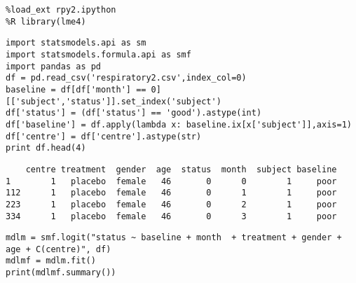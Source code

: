 \documentclass[12pt,fleqn]{article}\usepackage{../common}
\begin{document}
\begin{verbatim}
%load_ext rpy2.ipython
%R library(lme4)
\end{verbatim}

\begin{verbatim}
import statsmodels.api as sm
import statsmodels.formula.api as smf
import pandas as pd
df = pd.read_csv('respiratory2.csv',index_col=0)
baseline = df[df['month'] == 0][['subject','status']].set_index('subject')
df['status'] = (df['status'] == 'good').astype(int)
df['baseline'] = df.apply(lambda x: baseline.ix[x['subject']],axis=1)
df['centre'] = df['centre'].astype(str)
print df.head(4)
\end{verbatim}

\begin{verbatim}
    centre treatment  gender  age  status  month  subject baseline
1        1   placebo  female   46       0      0        1     poor
112      1   placebo  female   46       0      1        1     poor
223      1   placebo  female   46       0      2        1     poor
334      1   placebo  female   46       0      3        1     poor
\end{verbatim}


\begin{verbatim}
mdlm = smf.logit("status ~ baseline + month  + treatment + gender + age + C(centre)", df)
mdlmf = mdlm.fit()
print(mdlmf.summary())
\end{verbatim}
\end{document}
